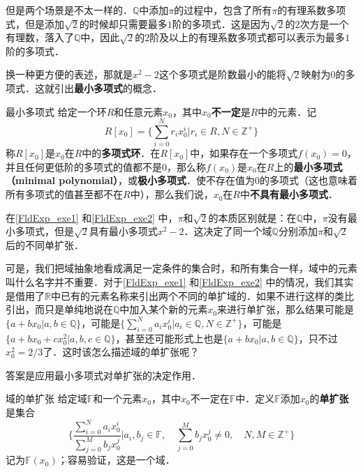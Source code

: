 但是两个场景是不太一样的．$\mathbb{Q}$中添加$\pi$的过程中，包含了所有$\pi$的有理系数多项式，但是添加$\sqrt{2}$的时候却只需要最多$1$阶的多项式．这是因为$\sqrt{2}$的$2$次方是一个有理数，落入了$\mathbb{Q}$中，因此$\sqrt{2}$的$2$阶及以上的有理系数多项式都可以表示为最多$1$阶的多项式．

换一种更方便的表述，那就是$x^2-2$这个多项式是阶数最小的能将$\sqrt{2}$映射为$0$的多项式．这就引出\textbf{最小多项式}的概念．

\begin{definition}{最小多项式}
给定一个环$R$和任意元素$x_0$，其中$x_0$\textbf{不一定}是$R$中的元素．记
$$R[x_0]=\{\sum_{i=0}^N r_ix_0^i|r_i\in R, N\in\mathbb{Z}^+\}$$称$R[x_0]$是$x_0$在$R$中的\textbf{多项式环}．在$R[x_0]$中，如果存在一个多项式$f(x_0)=0$，并且任何更低阶的多项式的值都不是$0$，那么称$f(x_0)$是$x_0$在$R$上的\textbf{最小多项式（minimal polynomial）}，或\textbf{极小多项式}．使不存在值为$0$的多项式（这也意味着所有多项式的值甚至都不在$R$中），那么我们说，$x_0$在$R$中\textbf{不具有最小多项式}．
\end{definition}

在\autoref{FldExp_exe1} 和\autoref{FldExp_exe2} 中，$\pi$和$\sqrt{2}$的本质区别就是：在$\mathbb{Q}$中，$\pi$没有最小多项式，但是$\sqrt{2}$具有最小多项式$x^2-2$．这决定了同一个域$\mathbb{Q}$分别添加$\pi$和$\sqrt{2}$后的不同单扩张．

可是，我们把域抽象地看成满足一定条件的集合时，和所有集合一样，域中的元素叫什么名字并不重要．对于\autoref{FldExp_exe1} 和\autoref{FldExp_exe2} 中的情况，我们其实是借用了$\mathbb{R}$中已有的元素名称来引出两个不同的单扩域的．如果不进行这样的类比引出，而只是单纯地说在$\mathbb{Q}$中加入某个新的元素$x_0$来进行单扩张，那么结果可能是$\{a+bx_0|a, b\in\mathbb{Q}\}$，可能是$\{\sum_{i=0}^N a_ix_0^i|a_i\in\mathbb{Q}, N\in\mathbb{Z}^+\}$，可能是$\{a+bx_0+cx_0^2|a, b, c\in\mathbb{Q}\}$，甚至还可能形式上也是$\{a+bx_0|a, b\in\mathbb{Q}\}$，只不过$x_0^2=2/3$了．这时该怎么描述域的单扩张呢？

答案是应用最小多项式对单扩张的决定作用．

\begin{definition}{域的单扩张}\label{FldExp_def1}
给定域$\mathbb{F}$和一个元素$x_0$，其中$x_0$不一定在$\mathbb{F}$中．定义$\mathbb{F}$添加$x_0$的\textbf{单扩张}是集合
\begin{equation}
\{\frac{\sum_{i=0}^N a_ix_0^i}{\sum_{j=0}^M b_jx_0^j}|a_i, b_j\in\mathbb{F},\quad\sum_{j=0}^M b_jx_0^j\not=0,\quad N, M\in\mathbb{Z}^+\}
\end{equation}
记为$\mathbb{F}(x_0)$；容易验证，这是一个域．
\end{definition}

